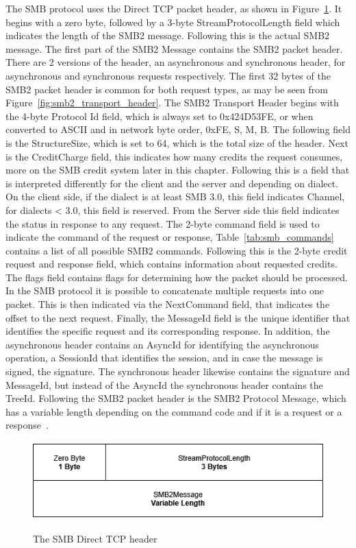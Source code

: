\documentclass[english, 12pt, a4paper, elec, utf8, a-2b, online]{aaltothesis}
\begin{document}
The SMB protocol uses the Direct TCP packet header, as shown in Figure~\ref{fig:direct_tcp_header}.
It begins with a zero byte, followed by a 3-byte StreamProtocolLength field which
indicates the length of the SMB2 message. Following this is the actual SMB2 message.
The first part of the SMB2 Message contains the SMB2 packet header. There are 2 versions
of the header, an asynchronous and synchronous header, for asynchronous and synchronous
requests respectively. The first 32 bytes of the SMB2 packet header is common for both
request types, as may be seen from Figure~\ref{fig:smb2_transport_header}. The SMB2 Transport
Header begins with the 4-byte Protocol Id field, which is always set to 0x424D53FE,
or when converted to ASCII and in network byte order, 0xFE, S, M, B. The following field
is the StructureSize, which is set to 64, which is the total size of the header. Next
is the CreditCharge field, this indicates how many credits the request consumes, more on
the SMB credit system later in this chapter. Following this is a field that is 
interpreted differently for the client and the server and depending on dialect.
On the client side, if the dialect is at least SMB 3.0, this field indicates Channel,
for dialects < 3.0, this field is reserved. From the Server side this field indicates
the status in response to any request. The 2-byte command field is used to 
indicate the command of the request or response, Table~\ref{tab:smb_commands} contains
a list of all possible SMB2 commands. Following this is the 2-byte credit request and
response field, which contains information about requested credits. The flags field
contains flags for determining how the packet should be processed. In the SMB
protocol it is possible to concatenate multiple requests into one packet. This is then
indicated via the NextCommand field, that indicates the offset to the next request.
Finally, the MessageId field is the unique identifier that identifies the specific
request and its corresponding response. In addition, the asynchronous header contains
an AsyncId for identifying the asynchronous
operation, a SessionId that identifies the session, and in case the message is signed,
the signature. The synchronous header likewise contains the signature and MessageId, but instead
of the AsyncId the synchronous header contains the TreeId. Following
the SMB2 packet header is the SMB2 Protocol Message, which has a variable length depending
on the command code and if it is a request or a response~\cite{smb2_tech}.

\begin{figure}[h]
	\centering
	\includegraphics[alt={A block diagram of the SMB Direct TCP header format, detailing its fields and their sizes.}, height=3cm]{./images/smb_tcp_direct_header.drawio.png}
	\caption{The SMB Direct TCP header}
	\label{fig:direct_tcp_header}
\end{figure}
\end{document}
